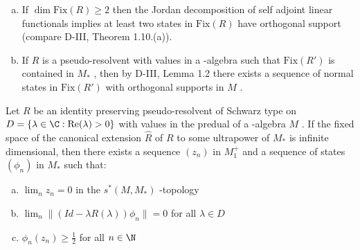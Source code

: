 \newpage

\begin{remark}\label{rem:d4-4.2}
\begin{enumerate}[(a)]
\item
If $ \dim \text{Fix}(R) \geq 2 $  then the Jordan decomposition of self adjoint linear functionals implies at least two states in $ \text{Fix}(R) $  have orthogonal support (compare D-III, Theorem 1.10.(a)).

\item
If $ R $  is a pseudo-resolvent with values in a \WA-algebra such that $ \text{Fix}(R') $  is contained in $ M_{*} $ , then by D-III, Lemma 1.2 there exists a sequence of normal states in $ \text{Fix}(R') $  with orthogonal supports in $ M $ .
\end{enumerate}
\end{remark}

\begin{lemma}\label{lem:d4-4.3}
Let $ R $  be an identity preserving pseudo-resolvent of Schwarz type on $ D = \{\lambda \in \C: \text{Re}(\lambda) > 0\} $  with values in the predual of a \WA-algebra $ M $ .
If the fixed space of the canonical extension $ \hat{R} $  of $ R $  to some ultrapower of $ M_{*} $  is infinite dimensional, then there exists a sequence $ (z_{n}) $  in $ M_{1}^{+} $  and a sequence of states $ (\phi_{n}) $  in $ M_{*} $  such that:
\begin{enumerate}[(a)]
\item
$ \lim_{n} z_{n} = 0 $  in the $ s^{*}(M,M_{*}) $ -topology

\item
$ \lim_{n} \|(Id - \lambda R(\lambda))\phi_{n}\| = 0 $  for all $ \lambda \in D $ 

\item
$ \phi_{n}(z_{n}) \geq \frac{1}{2} $  for all $ n \in \N $ 
\end{enumerate}
\end{lemma}

